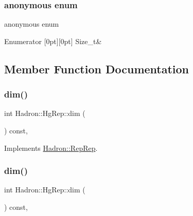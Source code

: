 \subsubsection{\texorpdfstring{anonymous enum}{anonymous enum}}
{\footnotesize\ttfamily anonymous enum}

\begin{DoxyEnumFields}{Enumerator}
[0pt][0pt]{}\mbox{\label{structHadron_1_1HgRep_acff328f18994ef32cfe11a8a4ae209c9a7090534cc35068f510d194147450b3f7}} 
Size\+\_\+t&\\
\hline

\end{DoxyEnumFields}


\subsection{Member Function Documentation}
\mbox{\label{structHadron_1_1HgRep_ad951f39b175b012e73b0f66217b25032}} 
\subsubsection{\texorpdfstring{dim()}{dim()}\hspace{0.1cm}{\footnotesize\ttfamily [1/3]}}
{\footnotesize\ttfamily int Hadron\+::\+Hg\+Rep\+::dim (\begin{DoxyParamCaption}{ }\end{DoxyParamCaption}) const\hspace{0.3cm}{\ttfamily [inline]}, {\ttfamily [virtual]}}



Implements \mbox{\hyperlink{structHadron_1_1RepRep_a92c8802e5ed7afd7da43ccfd5b7cd92b}{Hadron\+::\+Rep\+Rep}}.

\mbox{\label{structHadron_1_1HgRep_ad951f39b175b012e73b0f66217b25032}} 
\subsubsection{\texorpdfstring{dim()}{dim()}\hspace{0.1cm}{\footnotesize\ttfamily [2/3]}}
{\footnotesize\ttfamily int Hadron\+::\+Hg\+Rep\+::dim (\begin{DoxyParamCaption}{ }\end{DoxyParamCaption}) const\hspace{0.3cm}{\ttfamily [inline]}, {\ttfamily [virtual]}}



